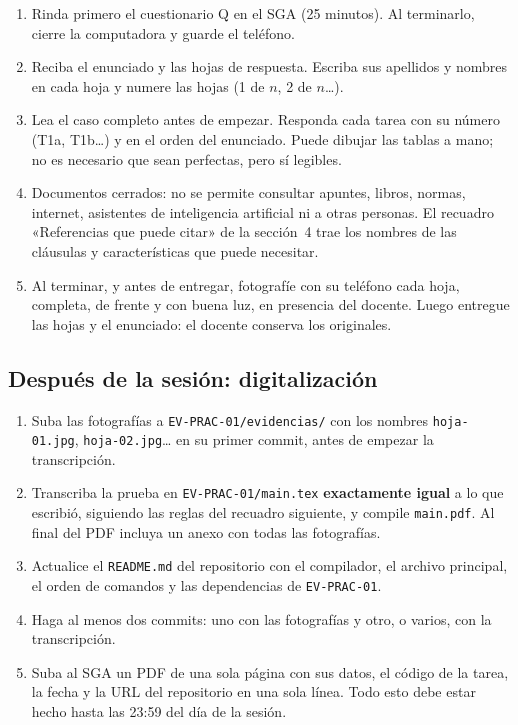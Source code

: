 \documentclass[11pt]{article}
\newcommand{\subseccion}[1]{\subsection{\textcolor{midblue}{#1}}}
\begin{document}
\begin{enumerate}[leftmargin=18pt,itemsep=2pt]

	\item Rinda primero el cuestionario Q en el SGA (25 minutos). Al terminarlo, cierre la computadora y guarde el teléfono.

	\item Reciba el enunciado y las hojas de respuesta. Escriba sus apellidos y nombres en cada hoja y numere las hojas (1 de $n$, 2 de $n$\ldots).

	\item Lea el caso completo antes de empezar. Responda cada tarea con su número (T1a, T1b\ldots) y en el orden del enunciado. Puede dibujar las tablas a mano; no es necesario que sean perfectas, pero sí legibles.

	\item Documentos cerrados: no se permite consultar apuntes, libros, normas, internet, asistentes de inteligencia artificial ni a otras personas. El recuadro «Referencias que puede citar» de la sección~4 trae los nombres de las cláusulas y características que puede necesitar.

	\item Al terminar, y antes de entregar, fotografíe con su teléfono cada hoja, completa, de frente y con buena luz, en presencia del docente. Luego entregue las hojas y el enunciado: el docente conserva los originales.

\end{enumerate}



\subseccion{Después de la sesión: digitalización}



\begin{enumerate}[leftmargin=18pt,itemsep=2pt]

	\item Suba las fotografías a \texttt{EV-PRAC-01/evidencias/} con los nombres \texttt{hoja-01.jpg}, \texttt{hoja-02.jpg}\ldots{} en su primer commit, antes de empezar la transcripción.

	\item Transcriba la prueba en \texttt{EV-PRAC-01/main.tex} \textbf{exactamente igual} a lo que escribió, siguiendo las reglas del recuadro siguiente, y compile \texttt{main.pdf}. Al final del PDF incluya un anexo con todas las fotografías.

	\item Actualice el \texttt{README.md} del repositorio con el compilador, el archivo principal, el orden de comandos y las dependencias de \texttt{EV-PRAC-01}.

	\item Haga al menos dos commits: uno con las fotografías y otro, o varios, con la transcripción.

	\item Suba al SGA un PDF de una sola página con sus datos, el código de la tarea, la fecha y la URL del repositorio en una sola línea. Todo esto debe estar hecho hasta las 23:59 del día de la sesión.

\end{enumerate}
\end{document}
